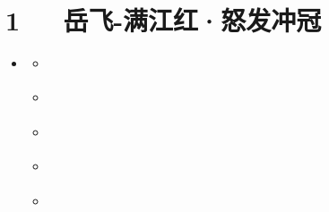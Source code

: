\documentclass[letterpaper,10pt,english]{sphinxmanual}
\begin{document}
\chapter{1   岳飞-满江红·怒发冲冠}
\label{\detokenize{p01_u6563_u6587/_u5cb3_u98de-_u6ee1_u6c5f_u7ea2_xb7_u6012_u53d1_u51b2_u51a0:id1}}\label{\detokenize{p01_u6563_u6587/_u5cb3_u98de-_u6ee1_u6c5f_u7ea2_xb7_u6012_u53d1_u51b2_u51a0::doc}}
\begin{sphinxShadowBox}
\begin{itemize}
\item {} 
\label{\detokenize{p01_u6563_u6587/_u5cb3_u98de-_u6ee1_u6c5f_u7ea2_xb7_u6012_u53d1_u51b2_u51a0:id10}}{\hyperref[\detokenize{p01_u6563_u6587/_u5cb3_u98de-_u6ee1_u6c5f_u7ea2_xb7_u6012_u53d1_u51b2_u51a0:id1}]{}}
\begin{itemize}
\item {} 
\label{\detokenize{p01_u6563_u6587/_u5cb3_u98de-_u6ee1_u6c5f_u7ea2_xb7_u6012_u53d1_u51b2_u51a0:id11}}{\hyperref[\detokenize{p01_u6563_u6587/_u5cb3_u98de-_u6ee1_u6c5f_u7ea2_xb7_u6012_u53d1_u51b2_u51a0:id3}]{}}

\item {} 
\label{\detokenize{p01_u6563_u6587/_u5cb3_u98de-_u6ee1_u6c5f_u7ea2_xb7_u6012_u53d1_u51b2_u51a0:id12}}{\hyperref[\detokenize{p01_u6563_u6587/_u5cb3_u98de-_u6ee1_u6c5f_u7ea2_xb7_u6012_u53d1_u51b2_u51a0:id4}]{}}

\item {} 
\label{\detokenize{p01_u6563_u6587/_u5cb3_u98de-_u6ee1_u6c5f_u7ea2_xb7_u6012_u53d1_u51b2_u51a0:id13}}{\hyperref[\detokenize{p01_u6563_u6587/_u5cb3_u98de-_u6ee1_u6c5f_u7ea2_xb7_u6012_u53d1_u51b2_u51a0:id5}]{}}

\item {} 
\label{\detokenize{p01_u6563_u6587/_u5cb3_u98de-_u6ee1_u6c5f_u7ea2_xb7_u6012_u53d1_u51b2_u51a0:id14}}{\hyperref[\detokenize{p01_u6563_u6587/_u5cb3_u98de-_u6ee1_u6c5f_u7ea2_xb7_u6012_u53d1_u51b2_u51a0:id6}]{}}

\item {} 
\label{\detokenize{p01_u6563_u6587/_u5cb3_u98de-_u6ee1_u6c5f_u7ea2_xb7_u6012_u53d1_u51b2_u51a0:id15}}{\hyperref[\detokenize{p01_u6563_u6587/_u5cb3_u98de-_u6ee1_u6c5f_u7ea2_xb7_u6012_u53d1_u51b2_u51a0:id7}]{}}


\end{itemize}
\end{itemize}
\end{sphinxShadowBox}
\end{document}
